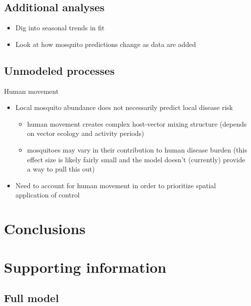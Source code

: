 \documentclass[10pt,letterpaper]{article}
\begin{document}
\subsection*{Additional analyses}

\begin{itemize}
  \item Dig into seasonal trends in fit
  \item Look at how mosquito predictions change as data are added
\end{itemize}

\subsection*{Unmodeled processes}

Human movement \cite{Adams2009, Cosner2009a, Stoddard2009, Dalziel2013}
\begin{itemize}
  \item Local mosquito abundance does not necessarily predict local disease risk
  \begin{itemize}
    \item human movement creates complex host-vector mixing structure (depends on vector ecology and activity periods)
    \item mosquitoes may vary in their contribution to human disease burden (this effect size is likely fairly small and the model doesn't (currently) provide a way to pull this out)
  \end{itemize}
  \item Need to account for human movement in order to prioritize spatial application of control
\end{itemize}
\section*{Conclusions}

\section*{Supporting information}

\subsection*{Full model}
\end{document}
